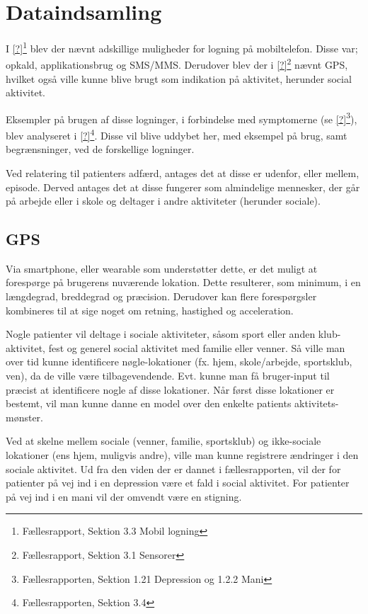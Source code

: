 \section{Dataindsamling}
I \cref{?}\footnote{Fællesrapport, Sektion 3.3 Mobil logning} blev der nævnt adskillige muligheder for logning på mobiltelefon.
Disse var; opkald, applikationsbrug og SMS/MMS.
Derudover blev der i \cref{?}\footnote{Fællesrapport, Sektion 3.1 Sensorer} nævnt GPS, hvilket også ville kunne blive brugt som indikation på aktivitet, herunder social aktivitet.

Eksempler på brugen af disse logninger, i forbindelse med symptomerne (se \cref{?}\footnote{Fællesrapporten, Sektion 1.21 Depression og 1.2.2 Mani}), blev analyseret i \cref{?}\footnote{Fællesrapporten, Sektion 3.4}.
Disse vil blive uddybet her, med eksempel på brug, samt begrænsninger, ved de forskellige logninger.

Ved relatering til patienters adfærd, antages det at disse er udenfor, eller mellem, episode.
Derved antages det at disse fungerer som almindelige mennesker, der går på arbejde eller i skole og deltager i andre aktiviteter (herunder sociale).

\subsection{GPS}
Via smartphone, eller wearable som understøtter dette, er det muligt at forespørge på brugerens nuværende lokation.
Dette resulterer, som minimum, i en længdegrad, breddegrad og præcision.
Derudover kan flere forespørgsler kombineres til at sige noget om retning, hastighed og acceleration.

Nogle patienter vil deltage i sociale aktiviteter, såsom sport eller anden klub-aktivitet, fest og generel social aktivitet med familie eller venner.
Så ville man over tid kunne identificere nøgle-lokationer (fx. hjem, skole/arbejde, sportsklub, ven), da de ville være tilbagevendende.
Evt. kunne man få bruger-input til præcist at identificere nogle af disse lokationer.
Når først disse lokationer er bestemt, vil man kunne danne en model over den enkelte patients aktivitets-mønster.

Ved at skelne mellem sociale (venner, familie, sportsklub) og ikke-sociale lokationer (ens hjem, muligvis andre), ville man kunne registrere ændringer i den sociale aktivitet.
Ud fra den viden der er dannet i fællesrapporten, vil der for patienter på vej ind i en depression være et fald i social aktivitet.
For patienter på vej ind i en mani vil der omvendt være en stigning.

